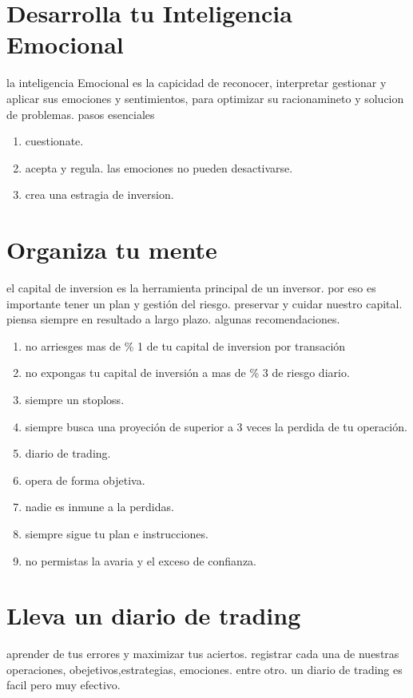 \documentclass{article}
\begin{document}
    \section{Desarrolla tu Inteligencia Emocional}
    la inteligencia Emocional es la capicidad de reconocer, interpretar gestionar y aplicar sus emociones y sentimientos, para optimizar su racionamineto
    y solucion de problemas.
    pasos esenciales 
    \begin{enumerate}
        \item cuestionate. 
        \item acepta y regula. las emociones no pueden desactivarse. 
        \item crea una estragia de inversion. 
    \end{enumerate}
    \section{Organiza tu mente}
    el capital de inversion es la herramienta principal de un inversor. 
    por eso es importante tener un plan y gestión del riesgo. preservar y cuidar nuestro capital.
    piensa siempre en resultado a largo plazo. algunas recomendaciones.
    \begin{enumerate}
        \item no arriesges mas de \% 1 de tu capital de inversion por transación
        \item no expongas tu capital de inversión a mas de \% 3 de riesgo diario.
        \item siempre un stoploss.
        \item siempre busca una proyeción de superior a 3 veces la perdida de tu operación.
        \item diario de trading.
        \item opera de forma objetiva.
        \item nadie es inmune a la perdidas.
        \item siempre sigue tu plan e instrucciones.
        \item no permistas la avaria y el exceso de confianza.
    \end{enumerate}
    \section{Lleva un diario de trading}
    aprender de tus errores y maximizar tus aciertos. 
    registrar cada una de nuestras operaciones, obejetivos,estrategias, emociones. entre otro.
    un diario de trading es facil pero muy efectivo.
\end{document}
